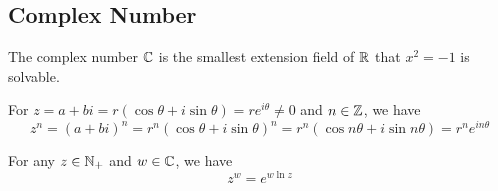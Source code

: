 \subsection{Complex Number}

The complex number $\mathbb{C}$ is the smallest extension field of $\mathbb{R}$ that $x^2 = -1$ is solvable.

\begin{theorem}
    For $z = a + b i = r(\cos \theta + i \sin \theta) = r e^{i \theta} \neq 0$ and $n \in \mathbb{Z}$, we have 
    \begin{equation}
        z^n = (a+bi)^n = r^n(\cos \theta + i \sin \theta)^n = r^n (\cos n\theta + i \sin n\theta) = r^n e^{in\theta}
    \end{equation}
\end{theorem}

\begin{theorem}
    For any $z \in \mathbb{N}_{+}$ and $w \in \mathbb{C}$, we have
    \begin{equation}
        z^w = e^{w \ln z}
    \end{equation}
\end{theorem}

